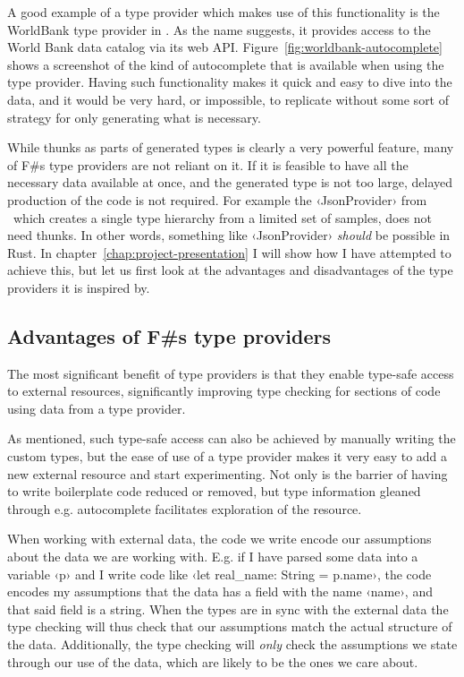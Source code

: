 A good example of a type provider which makes use of this functionality is the WorldBank type provider in \fsharpdata. As the name suggests, it provides access to the World Bank data catalog via its web API. Figure~\ref{fig:worldbank-autocomplete} shows a screenshot of the kind of autocomplete that is available when using the type provider. Having such functionality makes it quick and easy to dive into the data, and it would be very hard, or impossible, to replicate without some sort of strategy for only generating what is necessary.

While thunks as parts of generated types is clearly a very powerful feature, many of F\#s type providers are not reliant on it. If it is feasible to have all the necessary data available at once, and the generated type is not too large, delayed production of the code is not required. For example the ‹JsonProvider› from \fsharpdata\ which creates a single type hierarchy from a limited set of samples, does not need thunks. In other words, something like ‹JsonProvider› \emph{should} be possible in Rust. In chapter~\ref{chap:project-presentation} I will show how I have attempted to achieve this, but let us first look at the advantages and disadvantages of the type providers it is inspired by.

\subsection{Advantages of F\#s type providers}

The most significant benefit of type providers is that they enable type-safe access to external resources, significantly improving type checking for sections of code using data from a type provider.

As mentioned, such type-safe access can also be achieved by manually writing the custom types, but the ease of use of a type provider makes it very easy to add a new external resource and start experimenting. Not only is the barrier of having to write boilerplate code reduced or removed, but type information gleaned through e.g. autocomplete facilitates exploration of the resource.

When working with external data, the code we write encode our assumptions about the data we are working with. E.g. if I have parsed some data into a variable ‹p› and I write code like ‹let real_name: String = p.name›, the code encodes my assumptions that the data has a field with the name ‹name›, and that said field is a string. When the types are in sync with the external data the type checking will thus check that our assumptions match the actual structure of the data. Additionally, the type checking will \emph{only} check the assumptions we state through our use of the data, which are likely to be the ones we care about.

